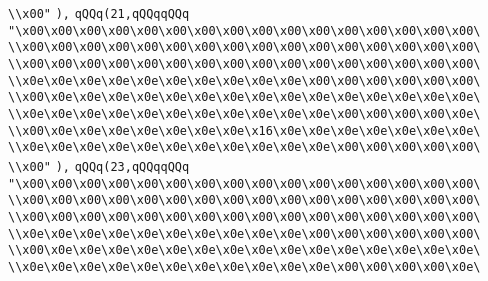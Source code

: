 \verb|\\x00"|\newline
\verb|),|\newline
\verb|qQQq(21,qQQqqQQq|\newline
\verb|"\x00\x00\x00\x00\x00\x00\x00\x00\x00\x00\x00\x00\x00\x00\x00\x00\|\newline
\verb|\\x00\x00\x00\x00\x00\x00\x00\x00\x00\x00\x00\x00\x00\x00\x00\x00\|\newline
\verb|\\x00\x00\x00\x00\x00\x00\x00\x00\x00\x00\x00\x00\x00\x00\x00\x00\|\newline
\verb|\\x0e\x0e\x0e\x0e\x0e\x0e\x0e\x0e\x0e\x0e\x00\x00\x00\x00\x00\x00\|\newline
\verb|\\x00\x0e\x0e\x0e\x0e\x0e\x0e\x0e\x0e\x0e\x0e\x0e\x0e\x0e\x0e\x0e\|\newline
\verb|\\x0e\x0e\x0e\x0e\x0e\x0e\x0e\x0e\x0e\x0e\x0e\x00\x00\x00\x00\x0e\|\newline
\verb|\\x00\x0e\x0e\x0e\x0e\x0e\x0e\x0e\x16\x0e\x0e\x0e\x0e\x0e\x0e\x0e\|\newline
\verb|\\x0e\x0e\x0e\x0e\x0e\x0e\x0e\x0e\x0e\x0e\x0e\x00\x00\x00\x00\x00\|\newline
\verb|\\x00"|\newline
\verb|),|\newline
\verb|qQQq(23,qQQqqQQq|\newline
\verb|"\x00\x00\x00\x00\x00\x00\x00\x00\x00\x00\x00\x00\x00\x00\x00\x00\|\newline
\verb|\\x00\x00\x00\x00\x00\x00\x00\x00\x00\x00\x00\x00\x00\x00\x00\x00\|\newline
\verb|\\x00\x00\x00\x00\x00\x00\x00\x00\x00\x00\x00\x00\x00\x00\x00\x00\|\newline
\verb|\\x0e\x0e\x0e\x0e\x0e\x0e\x0e\x0e\x0e\x0e\x00\x00\x00\x00\x00\x00\|\newline
\verb|\\x00\x0e\x0e\x0e\x0e\x0e\x0e\x0e\x0e\x0e\x0e\x0e\x0e\x0e\x0e\x0e\|\newline
\verb|\\x0e\x0e\x0e\x0e\x0e\x0e\x0e\x0e\x0e\x0e\x0e\x00\x00\x00\x00\x0e\|\newline
